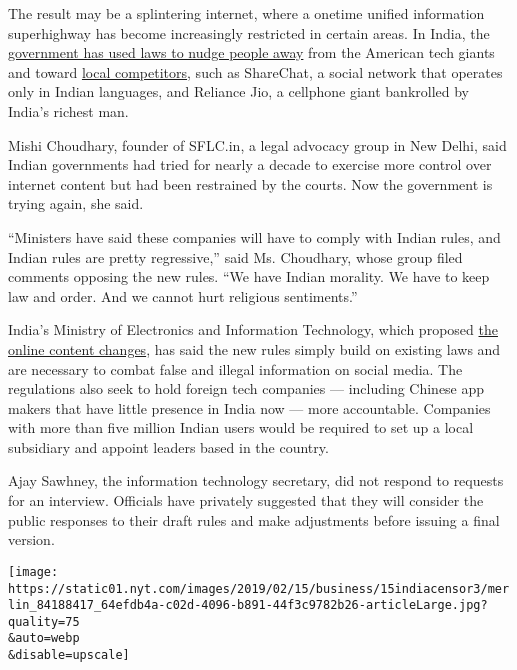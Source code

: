 The result may be a splintering internet, where a onetime unified
information superhighway has become increasingly restricted in certain
areas. In India, the
\href{https://www.nytimes.com/2018/08/31/technology/india-technology-american-giants.html}{government
has used laws to nudge people away} from the American tech giants and
toward
\href{https://www.nytimes.com/2019/01/30/technology/amazon-walmart-flipkart-india.html?rref=collection\%2Fbyline\%2Fvindu-goel\&action=click\&contentCollection=undefined\&region=stream\&module=stream_unit\&version=latest\&contentPlacement=1\&pgtype=collection}{local
competitors}, such as ShareChat, a social network that operates only in
Indian languages, and Reliance Jio, a cellphone giant bankrolled by
India's richest man.

Mishi Choudhary, founder of SFLC.in, a legal advocacy group in New
Delhi, said Indian governments had tried for nearly a decade to exercise
more control over internet content but had been restrained by the
courts. Now the government is trying again, she said.

``Ministers have said these companies will have to comply with Indian
rules, and Indian rules are pretty regressive,'' said Ms. Choudhary,
whose group filed comments opposing the new rules. ``We have Indian
morality. We have to keep law and order. And we cannot hurt religious
sentiments.''

India's Ministry of Electronics and Information Technology, which
proposed
\href{https://meity.gov.in/content/comments-suggestions-invited-draft-\%E2\%80\%9C-information-technology-intermediary-guidelines}{the
online content changes}, has said the new rules simply build on existing
laws and are necessary to combat false and illegal information on social
media. The regulations also seek to hold foreign tech companies ---
including Chinese app makers that have little presence in India now ---
more accountable. Companies with more than five million Indian users
would be required to set up a local subsidiary and appoint leaders based
in the country.

Ajay Sawhney, the information technology secretary, did not respond to
requests for an interview. Officials have privately suggested that they
will consider the public responses to their draft rules and make
adjustments before issuing a final version.

\texttt{[image: https://static01.nyt.com/images/2019/02/15/business/15indiacensor3/merlin\_84188417\_64efdb4a-c02d-4096-b891-44f3c9782b26-articleLarge.jpg?quality=75\\\&auto=webp\\\&disable=upscale]}

